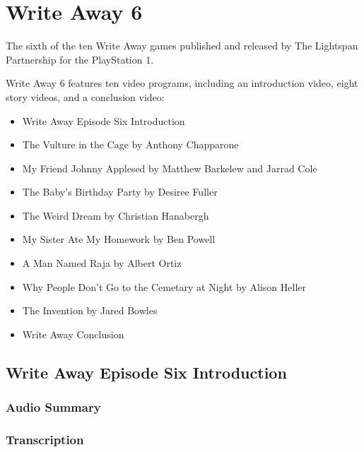 \chapter{Write Away 6}


The sixth of the ten Write Away games published and released by The Lightspan Partnership for the PlayStation 1.

Write Away 6 features ten video programs, including an introduction video, eight story videos, and a conclusion video:

\begin{itemize}
    \item Write Away Episode Six Introduction
    \item The Vulture in the Cage by Anthony Chapparone
    \item My Friend Johnny Applesed by Matthew Barkelew and Jarrad Cole
    \item The Baby's Birthday Party by Desiree Fuller
    \item The Weird Dream by Christian Hanabergh
    \item My Sister Ate My Homework by Ben Powell
    \item A Man Named Raja by Albert Ortiz
    \item Why People Don't Go to the Cemetary at Night by Alison Heller
    \item The Invention by Jared Bowles
    \item Write Away Conclusion
\end{itemize}

\clearpage
\newpage

\section{Write Away Episode Six Introduction}

\subsection{Audio Summary}

\subsection{Transcription}

